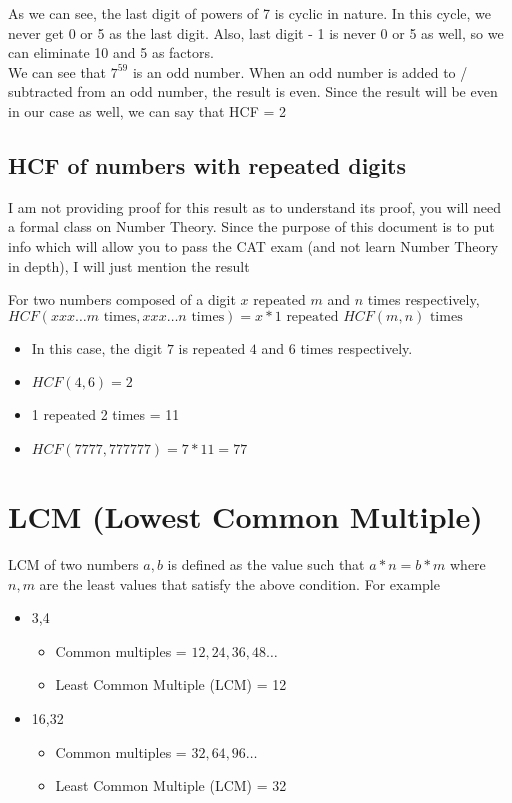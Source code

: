As we can see, the last digit of powers of 7 is cyclic in nature. In this cycle, we never get 0 or 5 as the last digit. Also, last digit - 1 is never 0 or 5 as well, so we can eliminate 10 and 5 as factors. \\

We can see that $7^{59}$ is an odd number. When an odd number is added to / subtracted from an odd number, the result is even. Since the result will be even in our case as well, we can say that HCF = 2 

\subsection{HCF of numbers with repeated digits}

\begin{NOTE}
    I am not providing proof for this result as to understand its proof, you will need a formal class on Number Theory. Since the purpose of this document is to put info which will allow you to pass the CAT exam (and not learn Number Theory in depth), I will just mention the result 
\end{NOTE}

For two numbers composed of a digit $x$ repeated $m$ and $n$ times respectively, $HCF(xxx\ldots m\text{ times},xxx\ldots n\text{ times}) = x * 1 \text{ repeated } HCF(m,n) \text{ times}$

\begin{itemize}
    \item In this case, the digit $7$ is repeated $4$ and $6$ times respectively. 
    \item $HCF(4,6) = 2$
    \item 1 repeated 2 times = 11
    \item $HCF(7777,777777) = 7 * 11 = 77$
\end{itemize}

\section{LCM (Lowest Common Multiple)}
LCM of two numbers $a,b$ is defined as the value such that $a * n = b * m $ where $n,m$ are the least values that satisfy the above condition. For example
\begin{itemize}
    \item 3,4
    \begin{itemize}
        \item Common multiples = $12,24,36,48\ldots$
        \item Least Common Multiple (LCM) = 12
    \end{itemize}
    \item 16,32
    \begin{itemize}
        \item Common multiples = $32,64,96\ldots$
        \item Least Common Multiple (LCM) = 32
    \end{itemize}
\end{itemize}

